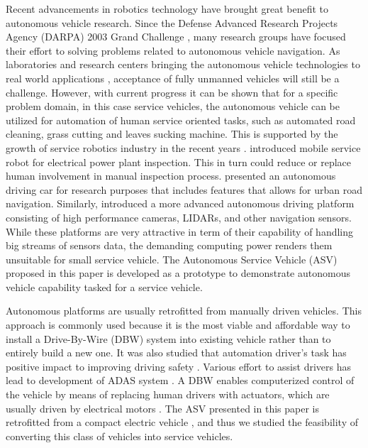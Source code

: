 \documentclass[10 pt,a4paper,conference]{IEEEtran}
\begin{document}
Recent advancements in robotics technology have brought great benefit to
autonomous vehicle research. Since the Defense Advanced Research
Projects Agency (DARPA) 2003 Grand Challenge
\citep{ventures2006stanley}, many research groups have focused their
effort to solving problems related to autonomous vehicle navigation. As
laboratories and research centers bringing the autonomous vehicle
technologies to real world applications \citep{Ford_Jan_16}, acceptance
of fully unmanned vehicles will still be a challenge. However, with
current progress it can be shown that for a specific problem domain, in
this case service vehicles, the autonomous vehicle can be utilized for
automation of human service oriented tasks, such as automated road
cleaning, grass cutting and leaves sucking machine. This is supported by
the growth of service robotics industry in the recent years
\citep{SVR_Nov_15}. \citeauthor{7225673} \citep{7225673} introduced
mobile service robot for electrical power plant inspection. This in turn
could reduce or replace human involvement in manual inspection process.
\citeauthor{6629559} \citep{6629559} presented an autonomous driving car
for research purposes that includes features that allows for urban road
navigation. Similarly, \citeauthor{7225765} \citep{7225765} introduced a
more advanced autonomous driving platform consisting of high performance
cameras, LIDARs, and other navigation sensors. While these platforms are
very attractive in term of their capability of handling big streams of
sensors data, the demanding computing power renders them unsuitable for
small service vehicle. The Autonomous Service Vehicle (ASV) proposed in
this paper is developed as a prototype to demonstrate autonomous vehicle
capability tasked for a service vehicle.

Autonomous platforms are usually retrofitted from manually driven
vehicles. This approach is commonly used because it is the most viable
and affordable way to install a Drive-By-Wire (DBW) system into existing
vehicle rather than to entirely build a new one. It was also studied
that automation driver's task has positive impact to improving driving
safety \citep{stanton1996fly}. Various effort to assist drivers has lead
to development of ADAS system \citep{6232125, 7225760}. A DBW enables
computerized control of the vehicle by means of replacing human drivers
with actuators, which are usually driven by electrical motors
\citep{1035218}. The ASV presented in this paper is retrofitted from a
compact electric vehicle \citep{SongZW_IV_2015}, and thus we studied the
feasibility of converting this class of vehicles into service vehicles.
\end{document}
